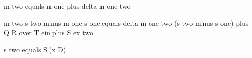 m two equals m one plus delta m one two

m two s two minus m one s one equals delta m one two (s two minus s one) plus Q R over T ein plus S ex two

s two equals S (x D)